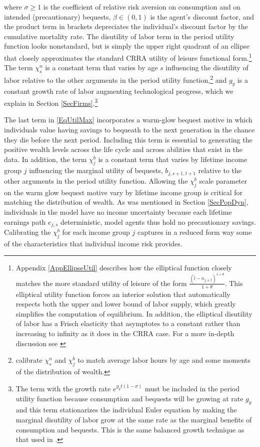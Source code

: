\documentclass[letterpaper,12pt]{article}
\theoremstyle{definition}
\begin{document}
\begin{spacing}{1.5}
    where $\sigma\geq 1$ is the coefficient of relative risk aversion on consumption and on intended (precautionary) bequests, $\beta\in(0,1)$ is the agent's discount factor, and the product term in brackets depreciates the individual's discount factor by the cumulative mortality rate. The disutility of labor term in the period utility function looks nonstandard, but is simply the upper right quadrant of an ellipse that closely approximates the standard CRRA utility of leisure functional form.\footnote{Appendix \ref{AppEllipseUtil} describes how the elliptical function closely matches the more standard utility of leisure of the form $\frac{(\tilde{l}-n_{j,s,t})^{1+\theta}}{1+\theta}$. This elliptical utility function forces an interior solution that automatically respects both the upper and lower bound of labor supply, which greatly simplifies the computation of equilibrium. In addition, the elliptical disutility of labor has a Frisch elasticity that asymptotes to a constant rather than increasing to infinity as it does in the CRRA case. For a more in-depth discussion see \citet{EvanPhillips:2015}} The term $\chi^n_s$ is a constant term that varies by age $s$ influencing the disutility of labor relative to the other arguments in the period utility function,\footnote{\citet{DEMPRW2015} calibrate $\chi^n_s$ and $\chi^b_j$ to match average labor hours by age and some moments of the distribution of wealth.} and $g_y$ is a constant growth rate of labor augmenting technological progress, which we explain in Section \ref{SecFirms}.\footnote{The term with the growth rate $e^{g_y t(1-\sigma)}$ must be included in the period utility function because consumption and bequests will be growing at rate $g_y$ and this term stationarizes the individual Euler equation by making the marginal disutility of labor grow at the same rate as the marginal benefits of consumption and bequests.  This is the same balanced growth technique as that used in \citet{MertensRavn:2011}.}

    The last term in \eqref{EqUtilMax} incorporates a warm-glow bequest motive in which individuals value having savings to bequeath to the next generation in the chance they die before the next period. Including this term is essential to generating the positive wealth levels across the life cycle and across abilities that exist in the data. In addition, the term $\chi^b_j$ is a constant term that varies by lifetime income group $j$ influencing the marginal utility of bequests, $b_{j,s+1,t+1}$ relative to the other arguments in the period utility function. Allowing the $\chi^b_j$ scale parameter on the warm glow bequest motive vary by lifetime income group is critical for matching the distribution of wealth. As was mentioned in Section \ref{SecPopDyn}, individuals in the model have no income uncertainty because each lifetime earnings path $e_{j,s}$ deterministic, model agents thus hold no precautionary savings. Calibrating the $\chi^b_j$ for each income group $j$ captures in a reduced form way some of the characteristics that individual income risk provides.


\end{spacing}
\end{document}
